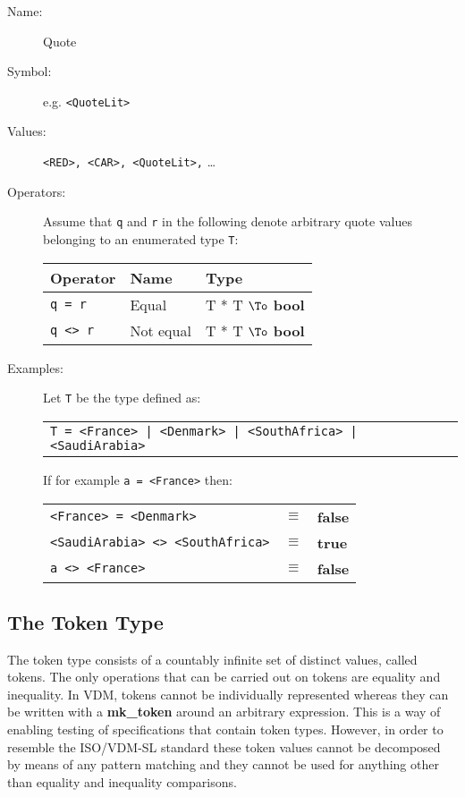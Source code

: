 \documentclass{overturerepchap}
\newcommand{\Index}[1]{#1\index{#1}}
\newcommand{\keyw}[1]{{\bf\ttfamily #1}}
\newcommand{\PROD}[2]{#1 * #2}
\newcommand{\TO}[2]{#1 $\To$ #2}
\begin{document}
\begin{description}
\item[Name:] \Index{Quote}
\item[Symbol:] e.g. {\tt <QuoteLit>}
\item[Values:] {\tt <RED>, <CAR>, <QuoteLit>,} \ldots
\item[Operators:] Assume that \texttt{q} and \texttt{r} in the
  following denote arbitrary quote values belonging to an enumerated
  type {\tt T}:

  \begin{tabular}{|l|l|l|}\hline
    Operator     & Name      & Type \\ \hline
    {\tt q = r}  & Equal     & \TO{\PROD{T}{T}}{\keyw{bool}} \\
    {\tt q <> r} & Not equal & \TO{\PROD{T}{T}}{\keyw{bool}} \\
    \hline
  \end{tabular}%


\item[Examples:] Let \texttt{T} be the type defined as:

  \begin{tabular}{l}
    {\tt T = <France> | <Denmark> | <SouthAfrica> | <SaudiArabia>} \\
  \end{tabular}

  If for example {\tt a = <France>}
  then:

  \begin{tabular}{lcl}
     {\tt <France> = <Denmark>} & $\equiv$ & \keyw{false}\\
     {\tt <SaudiArabia> <> <SouthAfrica>} & $\equiv$ & \keyw{true}\\
     {\tt a <> <France>} & $\equiv$ & \keyw{false}
  \end{tabular}
\end{description}

\subsection{The Token Type}

The token type consists of a countably infinite set of distinct
values, called tokens. The only operations that can be carried out on
tokens are equality and inequality. In VDM,
tokens cannot be individually represented whereas they can be written
with a \keyw{mk\_token} around an arbitrary expression. This is a way
of enabling testing of specifications that contain token
types. However, in order to resemble the ISO/VDM-SL standard these token
values cannot be decomposed by means of any pattern matching and they
cannot be used for anything other than equality and inequality
comparisons.
\end{document}
